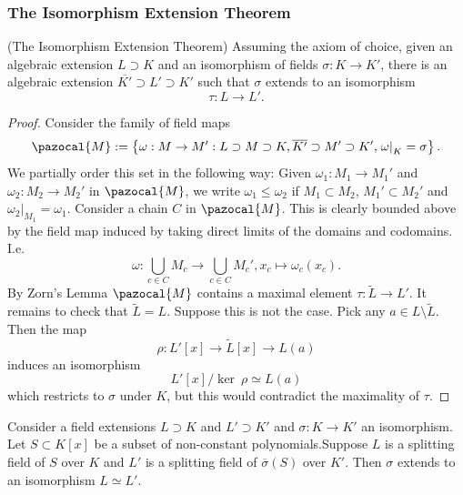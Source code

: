 \subsubsection{The Isomorphism Extension Theorem}
    \begin{theorem}(The Isomorphism Extension Theorem)
        Assuming the axiom of choice, given an algebraic extension $L\supset K$ and an isomorphism of fields $\sigma : K \rightarrow K'$, there is an algebraic extension $\overline{K'}\supset L'\supset K'$ such that $\sigma$ extends to an isomorphism 
        $$
            \tau : L \rightarrow L'.
        $$
    \end{theorem}
    \begin{proof}
        Consider the family of field maps
        $$
            \pazocal{M} := \left\{ \omega : M \rightarrow M' : L\supset M \supset K, \overline{K'}\supset M'\supset K', \left.\omega\right|_K = \sigma \right\}.
        $$
        We partially order this set in the following way: Given $\omega_1 : M_1\rightarrow M_1'$ and $\omega_2 : M_2\rightarrow M_2'$ in $\pazocal{M}$, we write $\omega_1 \leq \omega_2$ if $M_1\subset M_2$, $M_1'\subset M_2'$ and $\left.\omega_2\right|_{M_1} = \omega_1$. Consider a chain $C$ in $\pazocal{M}$. This is clearly bounded above by the field map induced by taking direct limits of the domains and codomains. I.e. 
        $$
            \omega : \bigcup_{c\in C} M_c \rightarrow \bigcup_{c\in C} M_c', x_c \mapsto \omega_c(x_c).
        $$
        By Zorn's Lemma $\pazocal{M}$ contains a maximal element $\tau : \widetilde{L} \rightarrow L'$. It remains to check that $\widetilde{L} = L$. Suppose this is not the case. Pick any $a\in L\setminus \widetilde{L}$. Then the map 
        $$
            \rho : L'[x] \rightarrow \widetilde{L}[x] \rightarrow L(a)
        $$ 
        induces an isomorphism 
        $$
            L'[x]/\ker \ \rho \simeq L(a)
        $$
        which restricts to $\sigma$ under $K$, but this would contradict the maximality of $\tau$. 
    \end{proof}
    \begin{corollary}\label{UniquenessOfSplittingFieldOverArbitrarySubset}
        Consider a field extensions $L\supset K$ and $L'\supset K'$ and $\sigma : K\rightarrow K'$ an isomorphism. Let $S\subset K[x]$ be a subset of non-constant polynomials.Suppose $L$ is a splitting field of $S$ over $K$ and $L'$ is a splitting field of $\overline{\sigma}(S)$ over $K'$. Then $\sigma$ extends to an isomorphism $L\simeq L'$. 
    \end{corollary}
